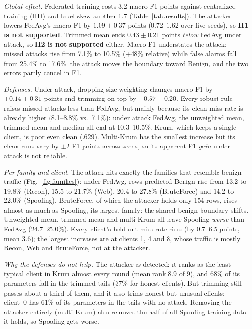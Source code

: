 \documentclass[journal]{IEEEtran}
\begin{document}
\emph{Global effect.} Federated training costs 3.2 macro-F1 points against centralized training (IID) and label skew another 1.7 (Table~\ref{tab:results}). The attacker lowers FedAvg's macro F1 by $1.09\pm0.37$ points (0.72--1.62 over five seeds), so \textbf{H1 is not supported}. Trimmed mean ends $0.43\pm0.21$ points \emph{below} FedAvg under attack, so \textbf{H2 is not supported} either. Macro F1 understates the attack: missed attacks rise from 7.1\% to 10.5\% (+48\% relative) while false alarms fall from 25.4\% to 17.6\%; the attack moves the boundary toward Benign, and the two errors partly cancel in F1.

\emph{Defenses.} Under attack, dropping size weighting changes macro F1 by $+0.14\pm0.31$ points and trimming on top by $-0.57\pm0.20$. Every robust rule raises missed attacks less than FedAvg, but mainly because its clean miss rate is already higher (8.1--8.8\% vs.\ 7.1\%): under attack FedAvg, the unweighted mean, trimmed mean and median all end at 10.3--10.5\%. Krum, which keeps a single client, is poor even clean (.629). Multi-Krum has the smallest increase but its clean runs vary by $\pm$2 F1 points across seeds, so its apparent F1 \emph{gain} under attack is not reliable.

\emph{Per family and client.} The attack hits exactly the families that resemble benign traffic (Fig.~\ref{fig:families}): under FedAvg, rows predicted Benign rise from 13.2 to 19.8\% (Recon), 15.5 to 21.7\% (Web), 20.4 to 27.8\% (BruteForce) and 14.2 to 22.0\% (Spoofing). BruteForce, of which the attacker holds only 154 rows, rises almost as much as Spoofing, its largest family: the shared benign boundary shifts. Unweighted mean, trimmed mean and multi-Krum all leave Spoofing \emph{worse} than FedAvg (24.7--25.0\%). Every client's held-out miss rate rises (by 0.7--6.5 points, mean 3.6); the largest increases are at clients 1, 4 and 8, whose traffic is mostly Recon, Web and BruteForce, not at the attacker.

\emph{Why the defenses do not help.} The attacker \emph{is} detected: it ranks as the least typical client in Krum almost every round (mean rank 8.9 of 9), and 68\% of its parameters fall in the trimmed tails (37\% for honest clients). But trimming still passes about a third of them, and it also trims honest but unusual clients: client~0 has 61\% of its parameters in the tails with no attack. Removing the attacker entirely (multi-Krum) also removes the half of all Spoofing training data it holds, so Spoofing gets worse.
\end{document}
